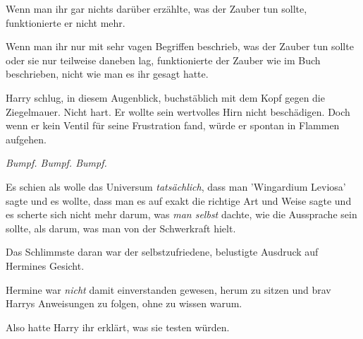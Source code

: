 Wenn man ihr gar nichts darüber erzählte, was der Zauber tun sollte, funktionierte er nicht mehr.

Wenn man ihr nur mit sehr vagen Begriffen beschrieb, was der Zauber tun sollte oder sie nur teilweise daneben lag, funktionierte der Zauber wie im Buch beschrieben, nicht wie man es ihr gesagt hatte.

Harry schlug, in diesem Augenblick, buchstäblich mit dem Kopf gegen die Ziegelmauer. Nicht hart. Er wollte sein wertvolles Hirn nicht beschädigen. Doch wenn er kein Ventil für seine Frustration fand, würde er spontan in Flammen aufgehen.

\emph{Bumpf. Bumpf. Bumpf.}

Es schien als wolle das Universum \emph{tatsächlich}, dass man 'Wingardium Leviosa' sagte und es wollte, dass man es auf exakt die richtige Art und Weise sagte und es scherte sich nicht mehr darum, was \emph{man selbst} dachte, wie die Aussprache sein sollte, als darum, was man von der Schwerkraft hielt.

\emph{}

Das Schlimmste daran war der selbstzufriedene, belustigte Ausdruck auf Hermines Gesicht.

Hermine war \emph{nicht} damit einverstanden gewesen, herum zu sitzen und brav Harrys Anweisungen zu folgen, ohne zu wissen warum.

Also hatte Harry ihr erklärt, was sie testen würden.

